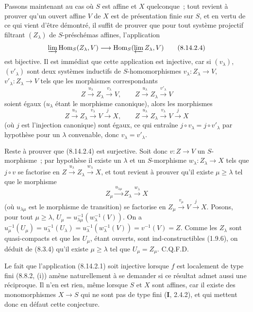 Passons maintenant au cas où $S$ est affine et $X$ quelconque~; tout revient à
prouver qu'un ouvert affine $V$ de $X$ est de présentation finie sur $S$, et
en vertu de ce qui vient d'être démontré, il suffit de prouver que pour tout
système projectif filtrant $(Z_\lambda)$ de $S$-préschémas affines,
l'application
\begin{equation}
\label{IV.8.14.2.4-fr}
\varinjlim\operatorname{Hom}_S(Z_\lambda,V)
\longrightarrow
\operatorname{Hom}_S(\varprojlim Z_\lambda,V) \tag{8.14.2.4}
\end{equation}
est bijective. Il est immédiat que cette application est injective, car si
$(v_\lambda)$, $(v'_\lambda)$ sont deux systèmes inductifs de
$S$-homomorphismes $v_\lambda:Z_\lambda\to V$,
$v'_\lambda:Z_\lambda\to V$ tels que les morphismes correspondants
\[
Z\xrightarrow{u_\lambda}Z_\lambda\xrightarrow{v_\lambda}V,
\qquad
Z\xrightarrow{u_\lambda}Z_\lambda\xrightarrow{v'_\lambda}V
\]
soient égaux ($u_\lambda$ étant le morphisme canonique), alors les morphismes
\[
Z\xrightarrow{u_\lambda}Z_\lambda\xrightarrow{v_\lambda}V
\xrightarrow{j}X,
\qquad
Z\xrightarrow{u_\lambda}Z_\lambda\xrightarrow{v_\lambda}V
\xrightarrow{j}X
\]
(où $j$ est l'injection canonique) sont égaux, ce qui entraîne
$j\circ v_\lambda=j\circ v'_\lambda$ par hypothèse pour un $\lambda$
convenable, donc $v_\lambda=v'_\lambda$.

Reste à prouver que (8.14.2.4) est surjective. Soit donc $v:Z\to V$ un
$S$-morphisme~; par hypothèse il existe un $\lambda$ et un $S$-morphisme
$w_\lambda:Z_\lambda\to X$ tels que $j\circ v$ se factorise en
$Z\xrightarrow{u_\lambda}Z_\lambda\xrightarrow{w_\lambda}X$,
et tout revient à prouver qu'il existe $\mu\geqslant\lambda$ tel que le
morphisme
\[
Z_\mu\xrightarrow{u_{\lambda\mu}}Z_\lambda
\xrightarrow{w_\lambda}X
\]
(où $u_{\lambda\mu}$ est le morphisme de transition) se factorise en
$Z_\mu\xrightarrow{v_\mu}V\xrightarrow{j}X$.
Posons, pour tout $\mu\geqslant\lambda$,
$U_\mu=u_{\lambda\mu}^{-1}(w_\lambda^{-1}(V))$. On a
$u_\mu^{-1}(U_\mu)=u_\lambda^{-1}(U_\lambda)
=u_\lambda^{-1}(w_\lambda^{-1}(V))=v^{-1}(V)=Z$.
Comme les $Z_\lambda$ sont quasi-compacts et que les $U_\mu$, étant ouverts,
sont ind-constructibles (1.9.6), on déduit de (8.3.4) qu'il existe
$\mu\geqslant\lambda$ tel que $U_\mu=Z_\mu$. C.Q.F.D.

\begin{remark}[8.14.3]
\label{IV.8.14.3-fr}
Le fait que l'application (8.14.2.1) soit injective lorsque $f$ est localement
de type fini (8.8.2, (i)) amène naturellement à se demander si ce résultat
admet aussi une réciproque. Il n'en est rien, même lorsque $S$ et $X$ sont
affines, car il existe des monomorphismes $X\to S$ qui ne sont pas de type fini
(\textbf{I}, 2.4.2), et qui mettent donc en défaut cette conjecture.
\end{remark}
